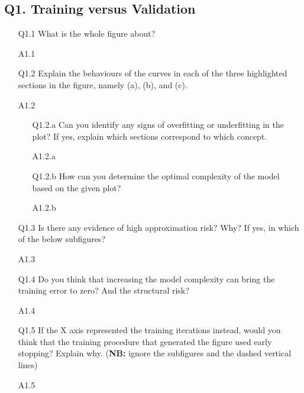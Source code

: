 \documentclass[tikz,14pt,fleqn]{article}
\begin{document}
\subsection{Q1. Training versus Validation}
\begin{itemize}
\item[Q1.1] What is the whole figure about?  
\item[A1.1] ~\\

\item[Q1.2] Explain the behaviours of the curves in each of the three highlighted sections in the figure, namely (a), (b), and (c).   
\item[A1.2] ~\\

\begin{itemize}
\item[Q1.2.a] Can you identify any signs of overfitting or underfitting in the plot? If yes, explain which sections correspond to which concept.
\item[A1.2.a] ~\\

\item[Q1.2.b] How can you determine the optimal complexity of the model based on the given plot?
\item[A1.2.b] ~\\
\end{itemize}
	
\item[Q1.3] Is there any evidence of high approximation risk? Why? If yes, in which of the below subfigures?  
\item[A1.3] ~\\

\item[Q1.4] Do you think that increasing the model complexity can bring the training error to zero? And the structural risk?  
\item[A1.4] ~\\

\item[Q1.5] If the X axis represented the training iterations instead, would you think that the training procedure that generated the figure used early stopping? Explain why. (\textbf{NB:} ignore the subfigures and the dashed vertical lines)
\item[A1.5] ~\\

\end{itemize}
\end{document}
